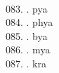 \begin{tabbing}
\egroup  \\
083.	. 	\> pya 	\> \bgroup\tibetan \def\u#1{\vtop{\baselineskip0pt\hbox{#1}\hbox{\tibsp\char123}}}\parindent=0pt \newbox\fillerbox\setbox\fillerbox\hbox{\vrule height0.4cm depth0.4cm width0pt}\def\filler{\copy\fillerbox}\filler\tibsp{}\tenrm\ \tibetan
\egroup  \\
084.	. 	\> phya 	\> \bgroup\tibetan \def\u#1{\vtop{\baselineskip0pt\hbox{#1}\hbox{\tibsp\char123}}}\parindent=0pt \newbox\fillerbox\setbox\fillerbox\hbox{\vrule height0.4cm depth0.4cm width0pt}\def\filler{\copy\fillerbox}\filler\tibsp{}\tenrm\ \tibetan
\egroup  \\
085.	. 	\> bya 	\> \bgroup\tibetan \def\u#1{\vtop{\baselineskip0pt\hbox{#1}\hbox{\tibsp\char123}}}\parindent=0pt \newbox\fillerbox\setbox\fillerbox\hbox{\vrule height0.4cm depth0.4cm width0pt}\def\filler{\copy\fillerbox}\filler\tibsp{}\tenrm\ \tibetan
\egroup  \\
086.	. 	\> mya 	\> \bgroup\tibetan \def\u#1{\vtop{\baselineskip0pt\hbox{#1}\hbox{\tibsp\char123}}}\parindent=0pt \newbox\fillerbox\setbox\fillerbox\hbox{\vrule height0.4cm depth0.4cm width0pt}\def\filler{\copy\fillerbox}\filler\tibsp{}\tenrm\ \tibetan
\egroup  \\
087.	. 	\> kra 	\> \bgroup\tibetan \def\u#1{\vtop{\baselineskip0pt\hbox{#1}\hbox{\tibsp\char123}}}\parindent=0pt \newbox\fillerbox\setbox\fillerbox\hbox{\vrule height0.4cm depth0.4cm width0pt}\def\filler{\copy\fillerbox}\filler\tibsp{}\tenrm\ \tibetan
\egroup  \\
\end{tabbing}
